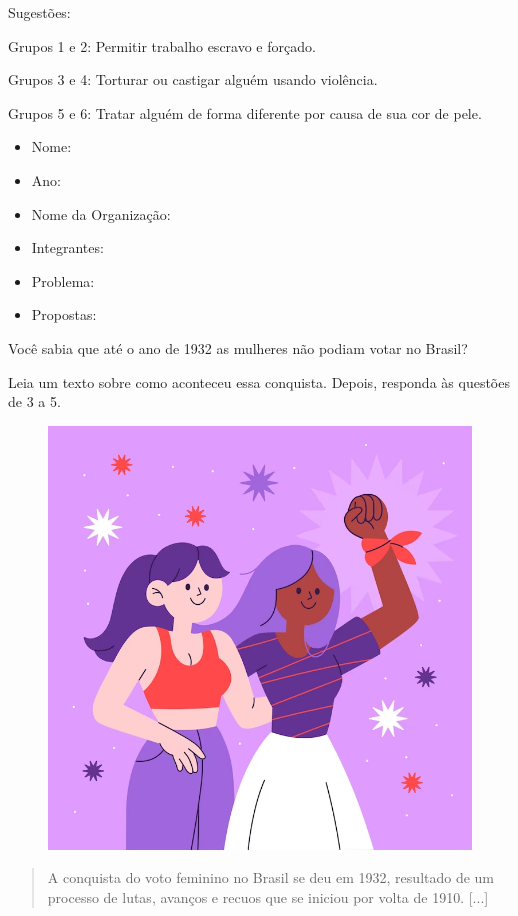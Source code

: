 \begin{itemize}
\begin{itemize}
\begin{itemize}
\begin{itemize}
{{\begin{itemize}
{Sugestões:

Grupos 1 e 2: Permitir trabalho escravo e forçado.

Grupos 3 e 4: Torturar ou castigar alguém usando violência.

Grupos 5 e 6: Tratar alguém de forma diferente por causa de sua cor de pele.}

\begin{itemize}
\item Nome: 

\item Ano: 

\item Nome da Organização: 

\item Integrantes: 

\item Problema: 

\item Propostas: 
\end{itemize}


Você sabia que até o ano de 1932 as mulheres não podiam votar no Brasil?

Leia um texto sobre como aconteceu essa conquista. Depois, responda às questões de 3 a 5.

\begin{figure}[htpb!]
\includegraphics[width=.5\textwidth]{./imgs/img49.png}
\caption{}
\end{figure}

\begin{quote}
A conquista do voto feminino no Brasil se deu em 1932, resultado de um
processo de lutas, avanços e recuos que se iniciou por volta de 1910. [...]


\end{quote}
\end{itemize}}}
\end{itemize}
\end{itemize}
\end{itemize}
\end{itemize}
